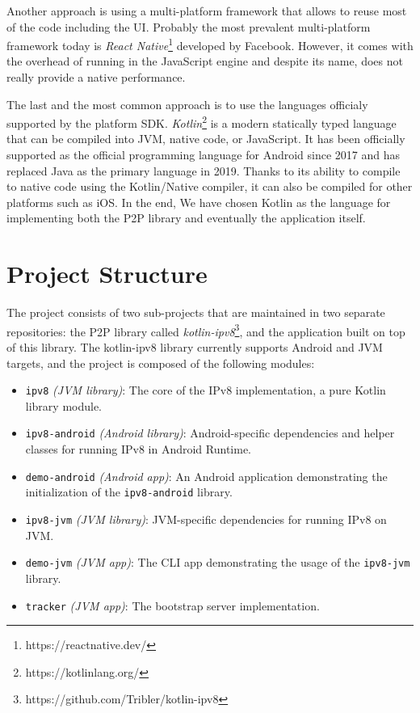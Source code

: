 Another approach is using a multi-platform framework that allows to reuse most of the code including the UI. Probably the most prevalent multi-platform framework today is \textit{React Native}\footnote{https://reactnative.dev/} developed by Facebook. However, it comes with the overhead of running in the JavaScript engine and despite its name, does not really provide a native performance.

The last and the most common approach is to use the languages officialy supported by the platform SDK. \textit{Kotlin}\footnote{https://kotlinlang.org/} is a modern statically typed language that can be compiled into JVM, native code, or JavaScript. It has been officially supported as the official programming language for Android since 2017 \cite{androidkotlin} and has replaced Java as the primary language in 2019. Thanks to its ability to compile to native code using the Kotlin/Native compiler, it can also be compiled for other platforms such as iOS. In the end, We have chosen Kotlin as the language for implementing both the P2P library and eventually the application itself.


\section{Project Structure}

The project consists of two sub-projects that are maintained in two separate repositories: the P2P library called \textit{kotlin-ipv8}\footnote{https://github.com/Tribler/kotlin-ipv8}, and the application built on top of this library. The kotlin-ipv8 library currently supports Android and JVM targets, and the project is composed of the following modules:

\begin{itemize}
    \item \texttt{ipv8} \textit{(JVM library)}: The core of the IPv8 implementation, a pure Kotlin library module.
    \item \texttt{ipv8-android} \textit{(Android library)}: Android-specific dependencies and helper classes for running IPv8 in Android Runtime.
    \item \texttt{demo-android} \textit{(Android app)}: An Android application demonstrating the initialization of the \texttt{ipv8-android} library.
    \item \texttt{ipv8-jvm} \textit{(JVM library)}: JVM-specific dependencies for running IPv8 on JVM.
    \item \texttt{demo-jvm} \textit{(JVM app)}: The CLI app demonstrating the usage of the \texttt{ipv8-jvm} library.
    \item \texttt{tracker} \textit{(JVM app)}: The bootstrap server implementation.
\end{itemize}

